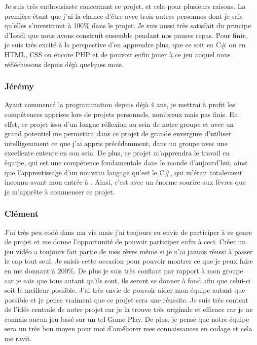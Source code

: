 ﻿\documentclass{article}
\begin{document}
Je suis très enthousiaste concernant ce projet, et cela pour plusieurs raisons. La première étant que j'ai la chance d'être
avec trois autres personnes dont je sais qu'elles s'investiront à 100\% dans le projet. Je suis aussi très satisfait 
du principe d'Issidi que nous avons construit ensemble pendant nos pauses repas. Pour finir, je suis très excité à la perspective
d'en apprendre plus, que ce soit en C\# ou en HTML, CSS ou encore PHP et de pouvoir enfin jouer à ce 
jeu auquel nous réfléchissons depuis déjà quelques mois.


\subsubsection{Jérémy }
Ayant commencé la programmation depuis déjà 4 ans, je mettrai à profit les compétences
apprises lors de projets personnels, nombreux mais pas finis.
En effet, ce projet issu d'un longue réflexion au sein de notre groupe et avec
un grand potentiel me permettra dans ce projet de grande envergure d'utiliser
intelligemment ce que j'ai appris précédemment, dans un groupe avec une excellente
entente en son sein.
De plus, ce projet m'apprendra le travail en équipe, qui est une compétence fondamentale
dans le monde d'aujourd'hui, ainsi que l'apprentissage d'un nouveau langage qu'est
le C\#, qui m'était totalement inconnu avant mon entrée à .
Ainsi, c'est avec un énorme sourire aux lèvres que je m'apprête à commencer ce projet.


\newpage\subsubsection{Clément }
J'ai très peu codé dans ma vie mais j'ai toujours eu envie de participer à ce genre de projet et  me donne
l'opportunité de pouvoir participer enfin à ceci. Créer un jeu vidéo a toujours fait partie de mes rêves même si je n'ai
jamais réussi à passer le cap tout seul.
Je saisis cette occasion pour pouvoir montrer ce que je peux faire en me donnant à 200\%. De plus je suis très confiant par
rapport à mon groupe car je sais que tous autant qu'ils sont, ils seront se donner à fond afin que celui-ci soit le meilleur
possible.
J'ai très envie de pouvoir aider mon équipe autant que possible et je pense vraiment que ce projet sera une réussite. Je
suis très content de l'idée centrale de notre projet car je la trouve très originale et efficace car je ne connais aucun
jeu basé sur un tel Game Play. De plus, je pense que notre équipe sera un très bon moyen pour moi d'améliorer mes connaissances
en codage et cela me ravit.
\end{document}

